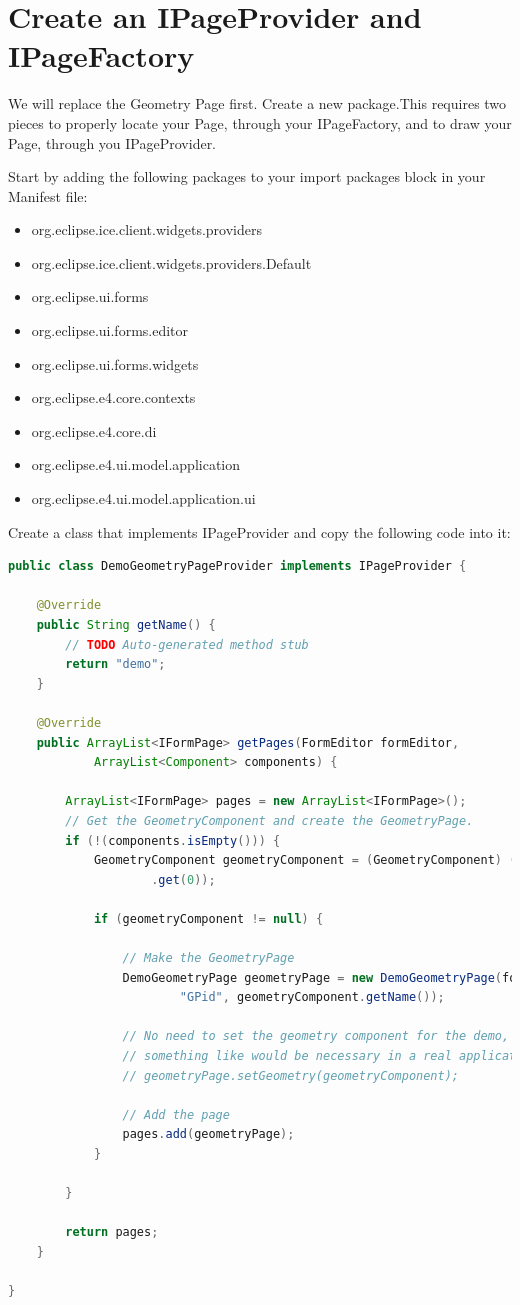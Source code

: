 \section{Create an IPageProvider and IPageFactory}

We will replace the Geometry Page first. Create a new package.This requires two
pieces to properly locate your Page, through your IPageFactory, and to draw
your Page, through you IPageProvider.

Start by adding the following packages to your import packages block in your
Manifest file:
\begin{itemize}
  \item org.eclipse.ice.client.widgets.providers
  \item org.eclipse.ice.client.widgets.providers.Default
  \item org.eclipse.ui.forms
  \item org.eclipse.ui.forms.editor
  \item org.eclipse.ui.forms.widgets
  \item org.eclipse.e4.core.contexts
  \item org.eclipse.e4.core.di
  \item org.eclipse.e4.ui.model.application
  \item org.eclipse.e4.ui.model.application.ui
\end{itemize}

Create a class that implements IPageProvider and copy the following code into
it:

\begin{lstlisting}[language=java]
public class DemoGeometryPageProvider implements IPageProvider {

    @Override
    public String getName() {
        // TODO Auto-generated method stub
        return "demo";
    }

    @Override
    public ArrayList<IFormPage> getPages(FormEditor formEditor,
            ArrayList<Component> components) {

        ArrayList<IFormPage> pages = new ArrayList<IFormPage>();
        // Get the GeometryComponent and create the GeometryPage.
        if (!(components.isEmpty())) {
            GeometryComponent geometryComponent = (GeometryComponent) (components
                    .get(0));

            if (geometryComponent != null) {

                // Make the GeometryPage
                DemoGeometryPage geometryPage = new DemoGeometryPage(formEditor,
                        "GPid", geometryComponent.getName());

                // No need to set the geometry component for the demo, but
                // something like would be necessary in a real application.
                // geometryPage.setGeometry(geometryComponent);

                // Add the page
                pages.add(geometryPage);
            }

        }

        return pages;
    }

}
\end{lstlisting}

